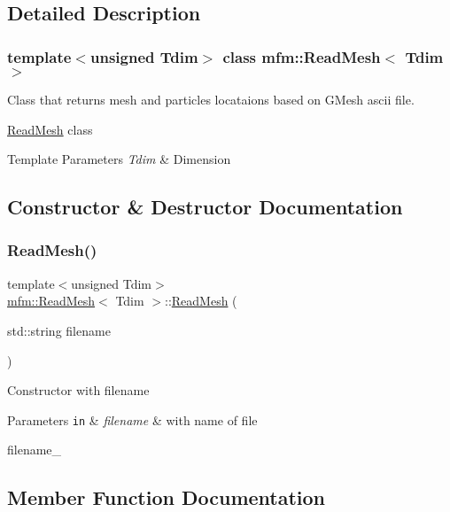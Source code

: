 \subsection{Detailed Description}
\subsubsection*{template$<$unsigned Tdim$>$\newline
class mfm\+::\+Read\+Mesh$<$ Tdim $>$}

Class that returns mesh and particles locataions based on G\+Mesh ascii file. 

\hyperlink{classmfm_1_1_read_mesh}{Read\+Mesh} class 
\begin{DoxyTemplParams}{Template Parameters}
{\em Tdim} & Dimension \\
\hline
\end{DoxyTemplParams}


\subsection{Constructor \& Destructor Documentation}
\mbox{\label{classmfm_1_1_read_mesh_a205f0231970ab4511eb07ba7ecfcff47}} 
\subsubsection{\texorpdfstring{Read\+Mesh()}{ReadMesh()}}
{\footnotesize\ttfamily template$<$unsigned Tdim$>$ \\
\hyperlink{classmfm_1_1_read_mesh}{mfm\+::\+Read\+Mesh}$<$ Tdim $>$\+::\hyperlink{classmfm_1_1_read_mesh}{Read\+Mesh} (\begin{DoxyParamCaption}\item[{std\+::string}]{filename }\end{DoxyParamCaption})\hspace{0.3cm}{\ttfamily [inline]}}

Constructor with filename 
\begin{DoxyParams}[1]{Parameters}
\mbox{\tt in}  & {\em filename} & with name of file \\
\hline
\end{DoxyParams}
filename\+\_\+ 

\subsection{Member Function Documentation}
\mbox{\label{classmfm_1_1_read_mesh_a7fe80e6e5bec7a835ffa03ef5ad92056}} 
